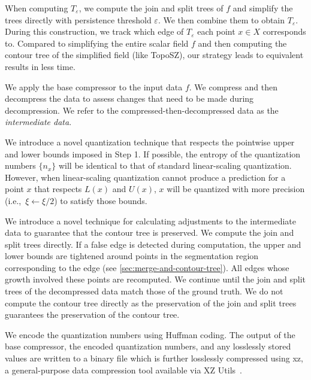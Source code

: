 When computing $T_\varepsilon$, we compute the join and split trees of $f$ and simplify the trees directly with persistence threshold $\varepsilon$. We then combine them to obtain $T_\varepsilon$. During this construction, we track which edge of $T_\varepsilon$ each point $x \in X$ corresponds to. Compared to simplifying the entire scalar field $f$ and then computing the contour tree of the simplified field (like TopoSZ), our strategy leads to equivalent results in less time.

We apply the base compressor to the input data $f$. 
We compress and then decompress the data to assess changes that need to be made during decompression. 
We refer to the compressed-then-decompressed data as the \emph{intermediate data}.

We introduce a novel quantization technique that respects the pointwise upper and lower bounds imposed in Step 1. 
If possible, the entropy of the quantization numbers $\{n_x\}$ will be identical to that of standard linear-scaling quantization.
However, when linear-scaling quantization cannot produce a prediction for a point $x$ that respects $L(x)$ and $U(x)$, $x$ will be quantized with more precision (i.e.,~$\xi \leftarrow \xi/2$) to satisfy those bounds.

We introduce a novel technique for calculating adjustments to the intermediate data to guarantee that the contour tree is preserved.
We compute the join and split trees directly. If a false edge is detected during computation, the upper and lower bounds are tightened around points in the segmentation region corresponding to the edge (see \cref{sec:merge-and-contour-tree}). All edges whose growth involved these points are recomputed.
We continue until the join and split trees of the decompressed data match those of the ground truth. We do not compute the contour tree directly as the preservation of the join and split trees guarantees the preservation of the contour tree.

We encode the quantization numbers using Huffman coding. The output of the base compressor, the encoded quantization numbers, and any losslessly stored values are written to a binary file which is further losslessly compressed using xz, a general-purpose data compression tool available via {XZ Utils}~\cite{XZUtils}.

